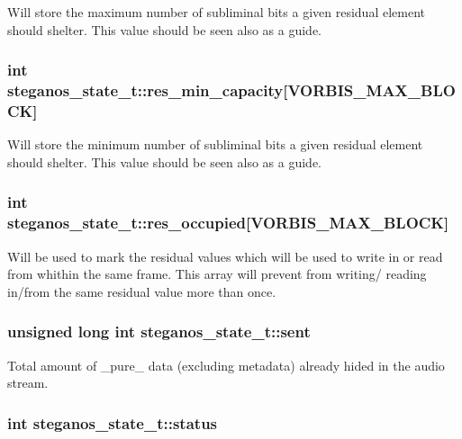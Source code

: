 \label{structsteganos__state__t_afc33131ff2db5dc8a1f31a6ba5f1c724}
Will store the maximum number of subliminal bits a given residual element should shelter. This value should be seen also as a guide. \hypertarget{structsteganos__state__t_a2bbaeab1769db3e7021791701f05a929}{
\subsubsection[{res\_\-min\_\-capacity}]{\setlength{\rightskip}{0pt plus 5cm}int {\bf steganos\_\-state\_\-t::res\_\-min\_\-capacity}\mbox{[}VORBIS\_\-MAX\_\-BLOCK\mbox{]}}}
\label{structsteganos__state__t_a2bbaeab1769db3e7021791701f05a929}
Will store the minimum number of subliminal bits a given residual element should shelter. This value should be seen also as a guide. \hypertarget{structsteganos__state__t_add02079c2fba135c27eca945cd6fdd53}{
\subsubsection[{res\_\-occupied}]{\setlength{\rightskip}{0pt plus 5cm}int {\bf steganos\_\-state\_\-t::res\_\-occupied}\mbox{[}VORBIS\_\-MAX\_\-BLOCK\mbox{]}}}
\label{structsteganos__state__t_add02079c2fba135c27eca945cd6fdd53}
Will be used to mark the residual values which will be used to write in or read from whithin the same frame. This array will prevent from writing/ reading in/from the same residual value more than once. \hypertarget{structsteganos__state__t_af5f22c44dbdd3ffe809f6dee20ec2343}{
\subsubsection[{sent}]{\setlength{\rightskip}{0pt plus 5cm}unsigned long int {\bf steganos\_\-state\_\-t::sent}}}
\label{structsteganos__state__t_af5f22c44dbdd3ffe809f6dee20ec2343}
Total amount of \_\-pure\_\- data (excluding metadata) already hided in the audio stream. \hypertarget{structsteganos__state__t_a5065391aa062854d0b9ce9eefe3a9509}{
\subsubsection[{status}]{\setlength{\rightskip}{0pt plus 5cm}int {\bf steganos\_\-state\_\-t::status}}}
